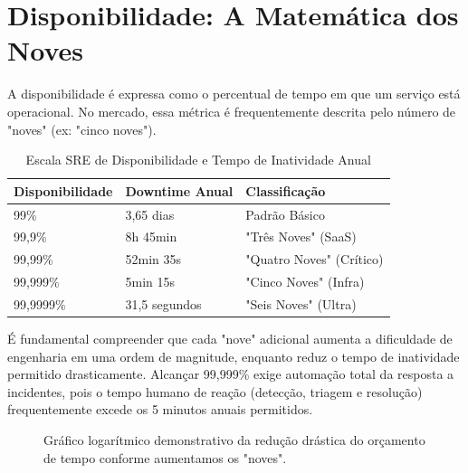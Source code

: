 \documentclass[12pt,a4paper,twoside]{report}
\begin{document}
\section{Disponibilidade: A Matemática dos Noves}

A disponibilidade é expressa como o percentual de tempo em que um serviço está operacional. No mercado, essa métrica é frequentemente descrita pelo número de "noves" (ex: "cinco noves"). 

\begin{table}[h!]
\centering
\caption{Escala SRE de Disponibilidade e Tempo de Inatividade Anual}
\begin{tabular}{@{}lll@{}}
\toprule
\textbf{Disponibilidade} & \textbf{Downtime Anual} & \textbf{Classificação} \\ \midrule
99\%                     & 3,65 dias              & Padrão Básico          \\
99,9\%                   & 8h 45min               & "Três Noves" (SaaS)    \\
99,99\%                  & 52min 35s              & "Quatro Noves" (Crítico)\\
99,999\%                 & 5min 15s               & "Cinco Noves" (Infra)  \\
99,9999\%                & 31,5 segundos          & "Seis Noves" (Ultra)   \\ \bottomrule
\end{tabular}
\end{table}

É fundamental compreender que cada "nove" adicional aumenta a dificuldade de engenharia em uma ordem de magnitude, enquanto reduz o tempo de inatividade permitido drasticamente. Alcançar 99,999\% exige automação total da resposta a incidentes, pois o tempo humano de reação (detecção, triagem e resolução) frequentemente excede os 5 minutos anuais permitidos.

\begin{figure}[h]
    \centering
    \caption{Gráfico logarítmico demonstrativo da redução drástica do orçamento de tempo conforme aumentamos os "noves".}
\end{figure}
\end{document}

